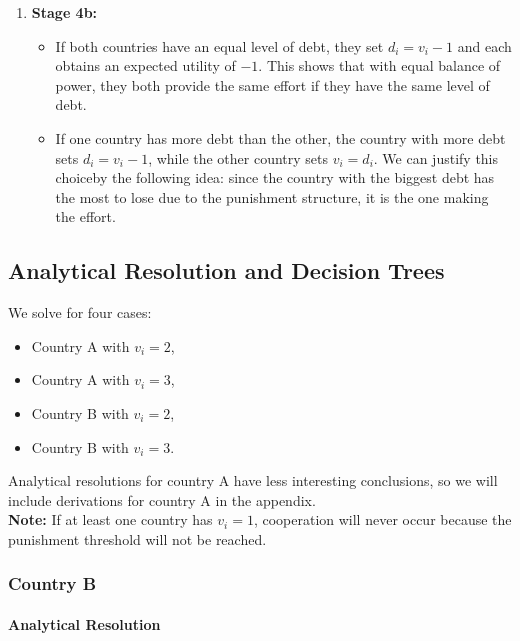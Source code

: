 \documentclass{article}
\begin{document}
\begin{enumerate}
    \item \textbf{Stage 4b:} 
    \begin{itemize}
        \item If both countries have an equal level of debt, they set $d_i = v_i - 1$ and each obtains an expected utility of $-1$. This shows that with equal balance of power, they both provide the same effort if they have the same level of debt.
        \item If one country has more debt than the other, the country with more debt sets $d_i = v_i - 1$, while the other country sets $v_i = d_i$. We can justify this choiceby the following idea: since the country with the biggest debt has the most to lose due to the punishment structure, it is the one making the effort.
    \end{itemize}
\end{enumerate}

 

\subsection{Analytical Resolution and Decision Trees}

We solve for four cases:
\begin{itemize}
    \item Country A with $v_i = 2$,
    \item Country A with $v_i = 3$,
    \item Country B with $v_i = 2$,
    \item Country B with $v_i = 3$.
\end{itemize}

Analytical resolutions for country A have less interesting conclusions, so we will include derivations for country A in the appendix. \\

\textbf{Note:} If at least one country has $v_i = 1$, cooperation will never occur because the punishment threshold will not be reached.

\subsubsection{Country B}


\paragraph{Analytical Resolution}
\end{document}
